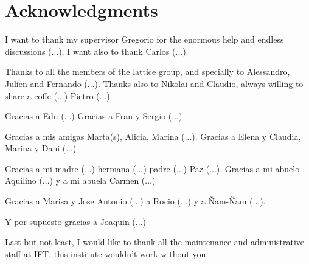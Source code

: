 
\bigskip

\begingroup
\let\clearpage\relax
\let\cleardoublepage\relax
\let\cleardoublepage\relax
\chapter*{Acknowledgments}

I want to thank my supervisor Gregorio for the enormous help and endless discussions (...). I want also to thank Carlos (...).

Thanks to all the members of the lattice group, and specially to Alessandro, Julien and Fernando (...). Thanks also to Nikolai and Claudio, always willing to share a coffe (...) Pietro (...)

Gracias a Edu (...) Gracias a Fran y Sergio (...) 

Gracias a mis amigas Marta(s), Alicia, Marina (...). Gracias a Elena y Claudia, Marina y Dani (...)

Gracias a mi madre (...) hermana (...) padre (...) Paz (...). Gracias a mi abuelo Aquilino (...) y a mi abuela Carmen (...)

Gracias a Marisa y Jose Antonio (...) a Rocio (...) y a Ñam-Ñam (...).

Y por supuesto gracias a Joaquin (...)

Last but not least, I would like to thank all the maintenance and administrative staff at IFT, this institute wouldn't work without you.

\bigskip

\endgroup
